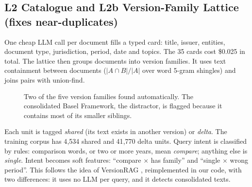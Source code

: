 \documentclass[10pt,a4paper]{article}
\begin{document}
\subsection*{L2 Catalogue and L2b Version-Family Lattice (fixes near-duplicates)}
One cheap LLM call per document fills a typed card: title, issuer, entities, document type, jurisdiction, period, date and topics. The 35 cards cost \$0.025 in total.
The lattice then groups documents into version families. It uses text containment between documents ($|A\cap B|/|A|$ over word 5-gram shingles) and joins pairs with union-find.

\begin{figure}[h]
\centering
{}
\caption{Two of the five version families found automatically. The consolidated Basel Framework, the distractor, is flagged because it contains most of its smaller siblings.}
\label{fig:lattice}
\end{figure}

Each unit is tagged \emph{shared} (its text exists in another version) or \emph{delta}. The training corpus has 4{,}534 shared and 41{,}770 delta units.
Query intent is classified by rules: comparison words, or two or more years, mean \emph{compare}; anything else is \emph{single}.
Intent becomes soft features: ``compare $\times$ has family'' and ``single $\times$ wrong period''.
This follows the idea of VersionRAG \cite{versionrag}, reimplemented in our code, with two differences: it uses no LLM per query, and it detects consolidated texts.
\end{document}
